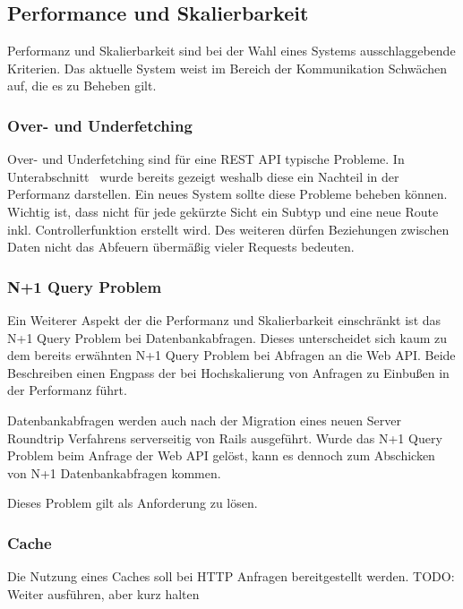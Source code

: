 
\subsection{Performance und Skalierbarkeit}
Performanz und Skalierbarkeit sind bei der Wahl eines Systems ausschlaggebende Kriterien. Das aktuelle System weist im Bereich der Kommunikation Schwächen auf, die es zu Beheben gilt.

\subsubsection{Over- und Underfetching}
Over- und Underfetching sind für eine REST API typische Probleme.
In Unterabschnitt~ wurde bereits gezeigt weshalb diese ein Nachteil in der Performanz darstellen.
Ein neues System sollte diese Probleme beheben können.
Wichtig ist, dass nicht für jede gekürzte Sicht ein Subtyp und eine neue Route inkl. Controllerfunktion erstellt wird. Des weiteren dürfen Beziehungen zwischen Daten nicht das Abfeuern übermäßig vieler Requests bedeuten.

\subsubsection{N+1 Query Problem}
Ein Weiterer Aspekt der die Performanz und Skalierbarkeit einschränkt ist das N+1 Query Problem bei Datenbankabfragen. Dieses unterscheidet sich kaum zu dem bereits erwähnten N+1 Query Problem bei Abfragen an die Web API. Beide Beschreiben einen Engpass der bei Hochskalierung von Anfragen zu Einbußen in der Performanz führt. 

Datenbankabfragen werden auch nach der Migration eines neuen Server Roundtrip Verfahrens serverseitig von Rails ausgeführt. Wurde das N+1 Query Problem beim Anfrage der Web API gelöst, kann es dennoch zum Abschicken von N+1 Datenbankabfragen kommen.

Dieses Problem gilt als Anforderung zu lösen.

\subsubsection{Cache}
Die Nutzung eines Caches soll bei HTTP Anfragen bereitgestellt werden.
TODO: Weiter ausführen, aber kurz halten


